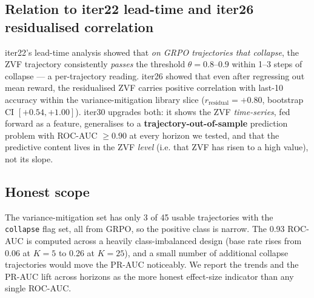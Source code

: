 \subsection{Relation to iter22 lead-time and iter26 residualised correlation}
\label{sec:zvf-iter30-relation}

iter22's lead-time analysis showed that \emph{on GRPO trajectories
that collapse}, the ZVF trajectory consistently \emph{passes} the
threshold $\theta = 0.8$--$0.9$ within 1--3 steps of collapse
--- a per-trajectory reading. iter26 showed that even after
regressing out mean reward, the residualised ZVF carries positive
correlation with last-10 accuracy within the variance-mitigation
library slice ($r_{\text{residual}}{=}+0.80$, bootstrap CI
$[+0.54, +1.00]$). iter30 upgrades both: it shows the ZVF
\emph{time-series}, fed forward as a feature, generalises to a
\textbf{trajectory-out-of-sample} prediction problem with
ROC-AUC $\ge 0.90$ at every horizon we tested, and that the
predictive content lives in the ZVF \emph{level} (i.e. that ZVF has
risen to a high value), not its slope.

\subsection{Honest scope}
\label{sec:zvf-iter30-honest}

The variance-mitigation set has only 3 of 45 usable trajectories
with the \texttt{collapse} flag set, all from GRPO, so the positive
class is narrow. The 0.93 ROC-AUC is computed across a heavily
class-imbalanced design (base rate rises from 0.06 at $K{=}5$ to
0.26 at $K{=}25$), and a small number of additional collapse
trajectories would move the PR-AUC noticeably. We report the
trends and the PR-AUC lift across horizons as the more honest
effect-size indicator than any single ROC-AUC.
